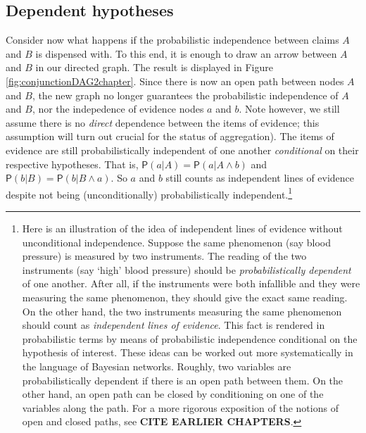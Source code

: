 \documentclass[
  10pt,
  dvipsnames,enabledeprecatedfontcommands]{scrartcl}
\newcommand{\pr}[1]{\ensuremath{\mathsf{P}(#1)}}
\begin{document}
\hypertarget{dependent-hypotheses}{%
\subsection{Dependent hypotheses}\label{dependent-hypotheses}}

Consider now what happens if the probabilistic independence between
claims \(A\) and \(B\) is dispensed with. To this end, it is enough to
draw an arrow between \(A\) and \(B\) in our directed graph. The result
is displayed in Figure \ref{fig:conjunctionDAG2chapter}. Since there is
now an open path between nodes \(A\) and \(B\), the new graph no longer
guarantees the probabilistic independence of \(A\) and \(B\), nor the
indepedence of evidence nodes \(a\) and \(b\). Note however, we still
assume there is no \emph{direct} dependence between the items of
evidence; this assumption will turn out crucial for the status of
aggregation). The items of evidence are still probabilistically
independent of one another \textit{conditional} on their respective
hypotheses. That is, \(\pr{a \vert A}=\pr{a \vert A \wedge b}\) and
\(\pr{b \vert B}=\pr{b \vert B \wedge a}\). So \(a\) and \(b\) still
counts as independent lines of evidence despite not being
(unconditionally) probabilistically independent.\footnote{Here is an
  illustration of the idea of independent lines of evidence without
  unconditional independence. Suppose the same phenomenon (say blood
  pressure) is measured by two instruments. The reading of the two
  instruments (say `high' blood pressure) should be
  \textit{probabilistically dependent} of one another. After all, if the
  instruments were both infallible and they were measuring the same
  phenomenon, they should give the exact same reading. On the other
  hand, the two instruments measuring the same phenomenon should count
  as \textit{independent lines of evidence}. This fact is rendered in
  probabilistic terms by means of probabilistic independence conditional
  on the hypothesis of interest. These ideas can be worked out more
  systematically in the language of Bayesian networks. Roughly, two
  variables are probabilistically dependent if there is an open path
  between them. On the other hand, an open path can be closed by
  conditioning on one of the variables along the path. For a more
  rigorous exposition of the notions of open and closed paths, see
  \textbf{CITE EARLIER CHAPTERS}.}
\end{document}

